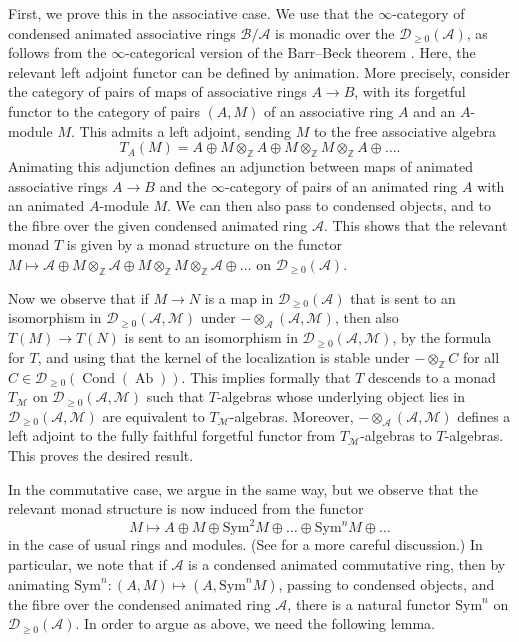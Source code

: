 \documentclass[11pt]{amsbook}
\DeclareMathOperator{\Cond}{Cond}
\DeclareMathOperator{\Ab}{Ab}
\numberwithin{equation}{section}
\numberwithin{theorem}{section}
\theoremstyle{definition}
\begin{document}
First, we prove this in the associative case. We use that the $\infty$-category of condensed animated associative rings $\mathcal B/\mathcal A$ is monadic over the $\mathcal D_{\geq 0}(\mathcal A)$, as follows from the $\infty$-categorical version of the Barr--Beck theorem \cite[Theorem 4.7.0.3]{LurieHA}. Here, the relevant left adjoint functor can be defined by animation. More precisely, consider the category of pairs of maps of associative rings $A\to B$, with its forgetful functor to the category of pairs $(A,M)$ of an associative ring $A$ and an $A$-module $M$. This admits a left adjoint, sending $M$ to the free associative algebra
\[
T_A(M)=A\oplus M\otimes_{\mathbb Z} A\oplus M\otimes_{\mathbb Z}M\otimes_{\mathbb Z} A\oplus\ldots .
\]
Animating this adjunction defines an adjunction between maps of animated associative rings $A\to B$ and the $\infty$-category of pairs of an animated ring $A$ with an animated $A$-module $M$. We can then also pass to condensed objects, and to the fibre over the given condensed animated ring $\mathcal A$. This shows that the relevant monad $T$ is given by a monad structure on the functor $M\mapsto \mathcal A\oplus M\otimes_{\mathbb Z} \mathcal A\oplus M\otimes_{\mathbb Z}M\otimes_{\mathbb Z} \mathcal A\oplus\ldots$ on $\mathcal D_{\geq 0}(\mathcal A)$.

Now we observe that if $M\to N$ is a map in $\mathcal D_{\geq 0}(\mathcal A)$ that is sent to an isomorphism in $\mathcal D_{\geq 0}(\mathcal A,\mathcal M)$ under $-\otimes_{\mathcal A} (\mathcal A,\mathcal M)$, then also $T(M)\to T(N)$ is sent to an isomorphism in $\mathcal D_{\geq 0}(\mathcal A,\mathcal M)$, by the formula for $T$, and using that the kernel of the localization is stable under $-\otimes_{\mathbb Z} C$ for all $C\in \mathcal D_{\geq 0}(\Cond(\Ab))$. This implies formally that $T$ descends to a monad $T_{\mathcal M}$ on $\mathcal D_{\geq 0}(\mathcal A,\mathcal M)$ such that $T$-algebras whose underlying object lies in $\mathcal D_{\geq 0}(\mathcal A,\mathcal M)$ are equivalent to $T_{\mathcal M}$-algebras. Moreover, $-\otimes_{\mathcal A} (\mathcal A,\mathcal M)$ defines a left adjoint to the fully faithful forgetful functor from $T_{\mathcal M}$-algebras to $T$-algebras. This proves the desired result.

In the commutative case, we argue in the same way, but we observe that the relevant monad structure is now induced from the functor
\[
M\mapsto A\oplus M\oplus \mathrm{Sym}^2 M\oplus \ldots \oplus \mathrm{Sym}^n M\oplus \ldots
\]
in the case of usual rings and modules. (See \cite[Section 25.2.2, Construction 25.2.2.6]{LurieSAG} for a more careful discussion.) In particular, we note that if $\mathcal A$ is a condensed animated commutative ring, then by animating $\mathrm{Sym}^n: (A,M)\mapsto (A,\mathrm{Sym}^n M)$, passing to condensed objects, and the fibre over the condensed animated ring $\mathcal A$, there is a natural functor $\mathrm{Sym}^n$ on $\mathcal D_{\geq 0}(\mathcal A)$. In order to argue as above, we need the following lemma.
\end{document}
